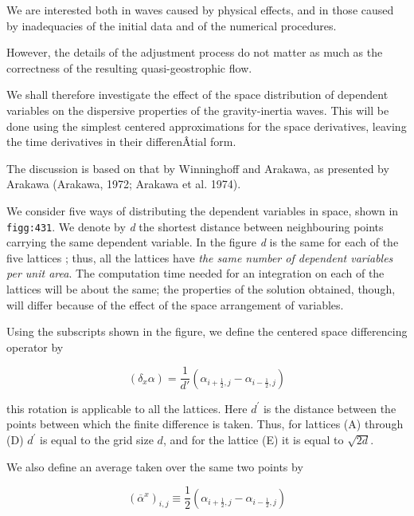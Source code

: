 We are interested both in waves caused by physical effects, and in those
caused by inadequacies of the initial data and of the numerical
procedures.

However, the details of the adjustment process do not matter as much as
the correctness of the resulting quasi-geostrophic flow.

We shall therefore investigate the effect of the space distribution of
dependent variables on the dispersive properties of the gravity-inertia
waves. This will be done using the simplest centered approximations for
the space derivatives, leaving the time derivatives in their
differenÂ­tial form.

The discussion is based on that by Winninghoff and Arakawa, as presented
by Arakawa (Arakawa, 1972; Arakawa et al. 1974).

We consider five ways of distributing the dependent variables in space,
shown in \texttt{figg:431}. We denote by \emph{d} the shortest distance
between neighbouring points carrying the same dependent variable. In the
figure \emph{d} is the same for each of the five lattices ; thus, all
the lattices have \emph{the same number of dependent variables per unit
area}. The computation time needed for an integration on each of the
lattices will be about the same; the properties of the solution
obtained, though, will differ because of the effect of the space
arrangement of variables.

Using the subscripts shown in the figure, we define the centered space
differencing operator by

\[(\delta_x\alpha) = \frac{1}{d'} \left( \alpha_{i+\frac{1}{2},j} - \alpha_{i-\frac{1}{2},j} \right)\]

this rotation is applicable to all the lattices. Here \(d^{'}\) is the
distance between the points between which the finite difference is
taken. Thus, for lattices (A) through (D) \(d^{'}\) is equal to the grid
size \(d\), and for the lattice (E) it is equal to \(\sqrt{2d}\).


We also define an average taken over the same two points by

\[\left( {\overline{\alpha}}^{x} \right)_{i,j} \equiv \frac{1}{2}\left( \alpha_{i + \frac{1}{2},j} - \alpha_{i - \frac{1}{2},j} \right)\]

